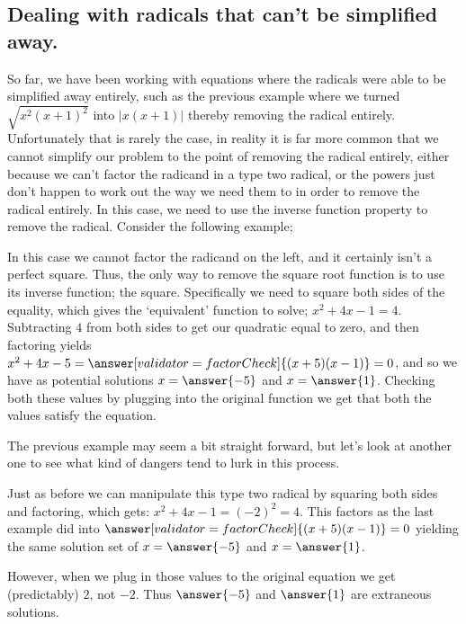 \documentclass{ximera}
\begin{document}
\subsection*{Dealing with radicals that can't be simplified away.}

    So far, we have been working with equations where the radicals were able to be simplified away entirely, such as the previous example where we turned $\sqrt{x^2(x+1)^2}$ into $|x(x+1)|$ thereby removing the radical entirely. Unfortunately that is rarely the case, in reality it is far more common that we cannot simplify our problem to the point of removing the radical entirely, either because we can't factor the radicand in a type two radical, or the powers just don't happen to work out the way we need them to in order to remove the radical entirely. In this case, we need to use the inverse function property to remove the radical. Consider the following example;

    \begin{example}[Determine which values of $x$ satisfy $\sqrt{x^2 + 4x - 1} = 2$]%
        In this case we cannot factor the radicand on the left, and it certainly isn't a perfect square. Thus, the only way to remove the square root function is to use its inverse function; the square. Specifically we need to square both sides of the equality, which gives the `equivalent' function to solve; $x^2 + 4x - 1 = 4$. Subtracting $4$ from both sides to get our quadratic equal to zero, and then factoring yields $x^2 + 4x - 5 = \answer[validator=factorCheck]{(x + 5)(x - 1)} = 0$, and so we have as potential solutions $x = \answer{-5}$ and $x = \answer{1}$. Checking both these values by plugging into the original function we get that both the values satisfy the equation.
    \end{example}%

    The previous example may seem a bit straight forward, but let's look at another one to see what kind of dangers tend to lurk in this process.

    \begin{example}[Determine which values of $x$ satisfy $\sqrt{x^2 + 4x - 1} = -2$]%
        Just as before we can manipulate this type two radical by squaring both sides and factoring, which gets: $x^2 + 4x - 1 = (-2)^2 = 4$. This factors as the last example did into $\answer[validator=factorCheck]{(x + 5)(x - 1)} = 0$ yielding the same solution set of $x = \answer{-5}$ and $x = \answer{1}$.

        However, when we plug in those values to the original equation we get (predictably) $2$, not $-2$. Thus $\answer{-5}$ and $\answer{1}$ are extraneous solutions.
    \end{example}%
    
\end{document}
